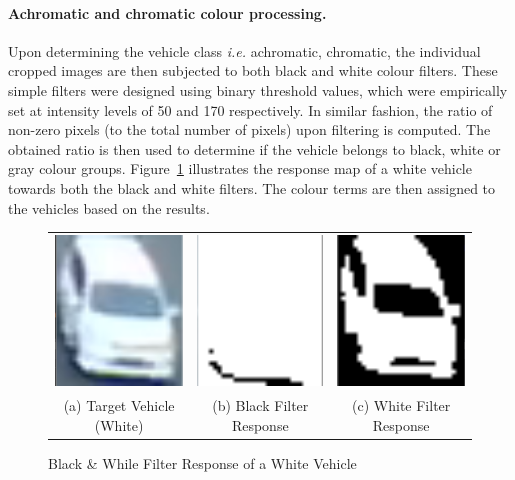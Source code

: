 \paragraph{Achromatic and chromatic colour processing.} Upon determining the vehicle class {\emph{i.e.} achromatic, chromatic}, the individual cropped images are then subjected to both black and white colour filters. These simple filters were designed using binary threshold values, which were empirically set at intensity levels of 50 and 170 respectively.
In similar fashion, the ratio of non-zero pixels (to the total number of pixels) upon filtering is computed. The obtained ratio is then used to determine if the vehicle belongs to black, white or gray colour groups. Figure~\ref{fig:blackwhite_filter} illustrates the response map of a white vehicle towards both the black and white filters.
The colour terms are then assigned to the vehicles based on the results.
\begin{figure}[htb!]
  \centering
\begin{tabular}{ccc}
 \includegraphics[width=0.22\linewidth]{image/retrievalOne/whitefilter1.png}   &
 \includegraphics[width=0.22\linewidth]{image/retrievalOne/whitefilter2.png}   &
 \includegraphics[width=0.22\linewidth]{image/retrievalOne/whitefilter3.png}   \\
(a) Target Vehicle (White) &
(b) Black Filter Response &
(c) White Filter Response \\
\end{tabular}
\caption{Black \& While Filter Response of a White Vehicle} \label{fig:blackwhite_filter}
\end{figure}

